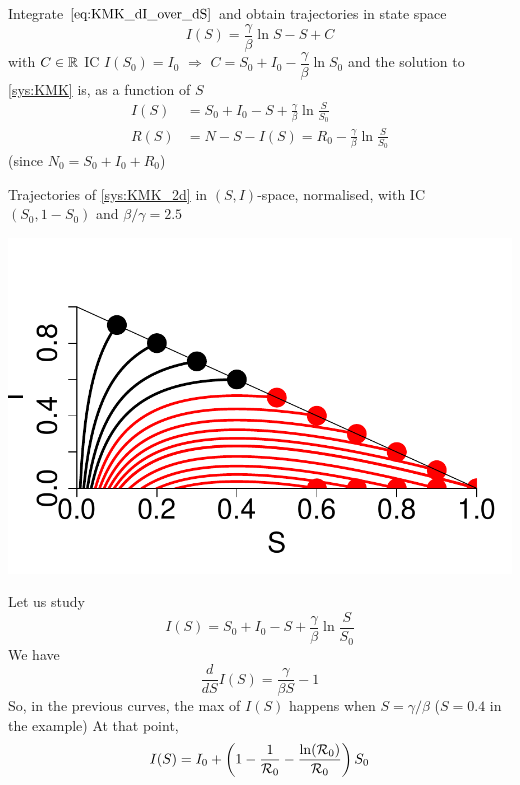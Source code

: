 \documentclass[aspectratio=169]{beamer}\usepackage[]{graphicx}\usepackage[]{xcolor}
\begin{document}
\begin{frame}{}
  Integrate $\eqref{eq:KMK_dI_over_dS}$ and obtain trajectories in state space
  $$
  I(S)=\frac\gamma\beta \ln S-S+C
  $$
  with $C\in\mathbb{R}$
  \vfill
  IC $I(S_0)=I_0$ $\Rightarrow$ $C=S_0+I_0-\dfrac \gamma\beta \ln S_0$ and the solution to \eqref{sys:KMK} is, as a function of $S$
  \begin{align*}
  I(S)&=S_0+I_0-S+\frac\gamma\beta \ln \frac S{S_0} \\
  R(S)&=N-S-I(S)=R_0-\frac\gamma\beta \ln \frac S{S_0}
  \end{align*}
  (since $N_0=S_0+I_0+R_0$)
\end{frame}




\begin{frame}
Trajectories of \eqref{sys:KMK_2d} in $(S,I)$-space, normalised, with IC $(S_0,1-S_0)$ and $\beta/\gamma=2.5$
\vfill
\begin{center}
\includegraphics[width=\textwidth]{FIGS/course-01-KMK_SI_plane-1.pdf}
\end{center}
\end{frame}



\begin{frame}{}
  Let us study
  $$
  I(S)=S_0+I_0-S+\frac\gamma\beta \ln \frac S{S_0} 
  $$
  We have
  $$
  \frac{d}{dS}I(S) = \frac{\gamma}{\beta S}-1
  $$
  So, in the previous curves, the max of $I(S)$ happens when $S=\gamma/\beta$ ($S=0.4$ in the example)
  \vfill
  At that point,
  $$
  I(S) = I_0+\left(
    1-\frac{1}{\mathcal{R}_0} - \frac{\ln(\mathcal{R}_0)}{\mathcal{R}_0}
  \right)S_0
  $$
\end{frame}
\end{document}
